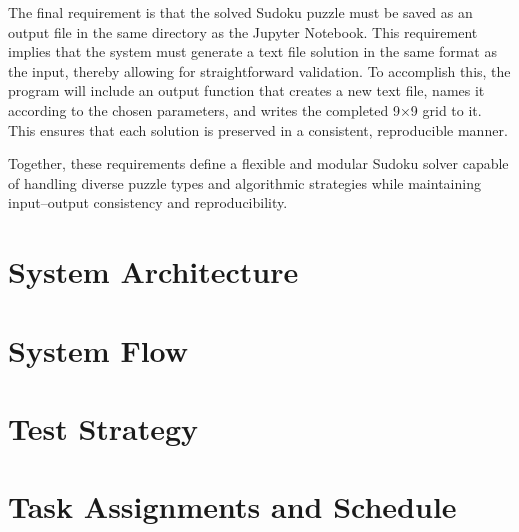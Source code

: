 \documentclass[12pt]{article}
\begin{document}
The final requirement is that the solved Sudoku puzzle must be saved as 
an output file in the same directory as the Jupyter Notebook. This 
requirement implies that the system must generate a text file solution 
in the same format as the input, thereby allowing for straightforward 
validation. To accomplish this, the program will include an output 
function that creates a new text file, names it according to the chosen 
parameters, and writes the completed 9×9 grid to it. This ensures that 
each solution is preserved in a consistent, reproducible manner.

Together, these requirements define a flexible and modular Sudoku 
solver capable of handling diverse puzzle types and algorithmic 
strategies while maintaining input–output consistency and reproducibility.
\section{System Architecture}
\section{System Flow}
\section{Test Strategy}
\section{Task Assignments and Schedule}
\end{document}
